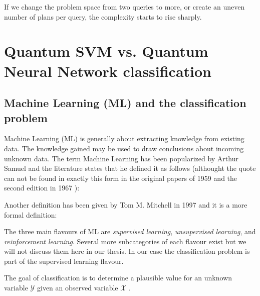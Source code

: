If we change the problem space from two queries to more, or create an uneven number of plans per query, the complexity starts to rise sharply.



\newpage

\section{Quantum SVM vs. Quantum Neural Network classification}

\subsection{Machine Learning (ML) and the classification problem}
Machine Learning (ML) is generally about extracting knowledge from existing data. The knowledge gained may be used to draw conclusions about incoming unknown data. The term Machine Learning has been popularized by Arthur Samuel and the literature states that he defined it as follows (althought the quote can not be found in exactly this form in the original papers of 1959 \cite{5389202_Samuel} and the second edition in 1967 \cite{5391906_Samuel2}):
\begin{quote}
\end{quote}
Another definition has been given by Tom M. Mitchell in 1997 \cite{mitchell1997machine} and it is a more formal definition:
\begin{quote}
\end{quote}
The three main flavours of ML are \emph{supervised learning}, \emph{unsupervised learning}, and \emph{reinforcement learning}\cite{en9080607}. Several more subcategories of each flavour exist but we will not discuss them here in our thesis. In our case the classification problem is part of the supervised learning flavour.



The goal of classification is to determine a plausible value for an unknown variable $\mathcal{Y}$ given an observed variable $\mathcal{X}$ \cite{barocas-hardt-narayanan}.

